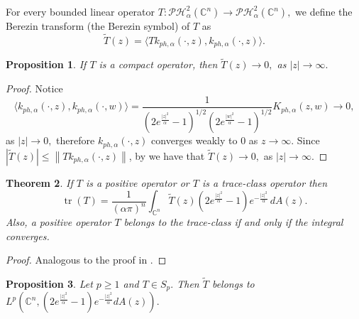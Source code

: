 \documentclass[10pt,leqno]{amsart}
\newtheorem{theorem}{Theorem}[section]
\newtheorem{proposition}[theorem]{Proposition}
\theoremstyle{remark}
\numberwithin{equation}{section}
\newcommand{\hph}{\mathcal{PH}_\alpha^2(\mathbb{C}^n)}%
\newcommand{\Kph}{K_{ph,\alpha}}%
\newcommand{\kph}{k_{ph,\alpha}}%
\DeclareMathOperator{\tr}{tr}
\begin{document}
For every bounded linear operator $T : \hph \to \hph,$ we define the Berezin transform (the Berezin symbol) of $T$ as
\[
	\widetilde{T}(z)=\langle T \kph (\cdot,z),\kph(\cdot,z) \rangle.
\]
\begin{proposition}
	If $T$ is a compact operator, then $\widetilde{T}(z) \to 0,$ as $|z| \to \infty.$
\end{proposition}
\begin{proof}
	Notice
	\[
		\langle \kph(\cdot,z),\kph(\cdot,w) \rangle = \frac{1}{\left( 2e^{\frac{|z|^2}{\alpha}}-1 \right) ^{1/2}\left( 2 e^{\frac{|w|^2}{\alpha}}-1 \right) ^{1/2}} \Kph(z,w) \to 0,
	\]
	as $|z|\to 0,$ therefore $\kph(\cdot,z)$ converges weakly to $0$ as $z \to \infty.$ Since $|\widetilde{T}(z)|\leq \left\lVert T \kph(\cdot,z) \right\rVert $, by \cite[Thm 1.14]{zhuOperatorTheoryFunction2007} we have that $\widetilde{T}(z)\to 0,$ as $|z|\to \infty.$
\end{proof}
\begin{theorem}\label{tm:berezin-transform-trace-formula}
	If $T$ is a positive operator or $T$ is a trace-class operator then
	\[
		\tr (T)= \frac{1}{\left( \alpha \pi \right) ^{n}}\int_{\mathbb{C}^{n}}^{}\widetilde{T} (z) \left( 2e^{\frac{|z|^2}{\alpha}}-1 \right) e^{-\frac{|z|^2}{\alpha}}\, dA(z).
	\]
	Also, a positive operator $T$ belongs to the trace-class if and only if the integral converges.
\end{theorem}
\begin{proof}
	Analogous to the proof in \cite[Prop. 3.3]{KeheZhuAnalysisOnFockSpaces}.
\end{proof}
\begin{proposition} \label{prop:schatten-class-berezin-transform}
	Let $p \geq 1$ and $T \in S_p.$ Then $\widetilde{T}$ belongs to $L^p(\mathbb{C}^{n},( 2e^{\frac{|z|^2}{\alpha}}-1 ) e^{-\frac{|z|^2}{\alpha}}dA(z)).$
\end{proposition}
\end{document}

